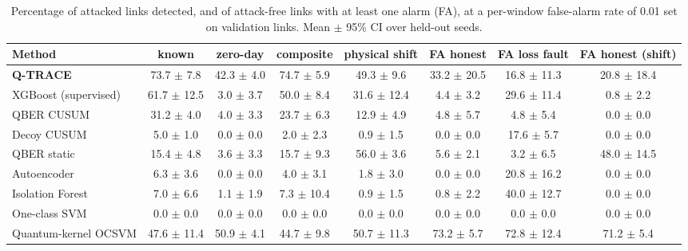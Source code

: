 \begin{table}[t]
\centering
\caption{Percentage of attacked links detected, and of attack-free links with at least one alarm (FA), at a per-window false-alarm rate of 0.01 set on validation links. Mean $\pm$ 95\% CI over held-out seeds.}
\label{tab:detection001}
\begin{tabular}{lccccccc}
\toprule
Method & known & zero-day & composite & physical shift & FA honest & FA loss fault & FA honest (shift) \\
\midrule
\textbf{Q-TRACE} & 73.7 $\pm$ 7.8 & 42.3 $\pm$ 4.0 & 74.7 $\pm$ 5.9 & 49.3 $\pm$ 9.6 & 33.2 $\pm$ 20.5 & 16.8 $\pm$ 11.3 & 20.8 $\pm$ 18.4 \\
XGBoost (supervised) & 61.7 $\pm$ 12.5 & 3.0 $\pm$ 3.7 & 50.0 $\pm$ 8.4 & 31.6 $\pm$ 12.4 & 4.4 $\pm$ 3.2 & 29.6 $\pm$ 11.4 & 0.8 $\pm$ 2.2 \\
QBER CUSUM & 31.2 $\pm$ 4.0 & 4.0 $\pm$ 3.3 & 23.7 $\pm$ 6.3 & 12.9 $\pm$ 4.9 & 4.8 $\pm$ 5.7 & 4.8 $\pm$ 5.4 & 0.0 $\pm$ 0.0 \\
Decoy CUSUM & 5.0 $\pm$ 1.0 & 0.0 $\pm$ 0.0 & 2.0 $\pm$ 2.3 & 0.9 $\pm$ 1.5 & 0.0 $\pm$ 0.0 & 17.6 $\pm$ 5.7 & 0.0 $\pm$ 0.0 \\
QBER static & 15.4 $\pm$ 4.8 & 3.6 $\pm$ 3.3 & 15.7 $\pm$ 9.3 & 56.0 $\pm$ 3.6 & 5.6 $\pm$ 2.1 & 3.2 $\pm$ 6.5 & 48.0 $\pm$ 14.5 \\
Autoencoder & 6.3 $\pm$ 3.6 & 0.0 $\pm$ 0.0 & 4.0 $\pm$ 3.1 & 1.8 $\pm$ 3.0 & 0.0 $\pm$ 0.0 & 20.8 $\pm$ 16.2 & 0.0 $\pm$ 0.0 \\
Isolation Forest & 7.0 $\pm$ 6.6 & 1.1 $\pm$ 1.9 & 7.3 $\pm$ 10.4 & 0.9 $\pm$ 1.5 & 0.8 $\pm$ 2.2 & 40.0 $\pm$ 12.7 & 0.0 $\pm$ 0.0 \\
One-class SVM & 0.0 $\pm$ 0.0 & 0.0 $\pm$ 0.0 & 0.0 $\pm$ 0.0 & 0.0 $\pm$ 0.0 & 0.0 $\pm$ 0.0 & 0.0 $\pm$ 0.0 & 0.0 $\pm$ 0.0 \\
Quantum-kernel OCSVM & 47.6 $\pm$ 11.4 & 50.9 $\pm$ 4.1 & 44.7 $\pm$ 9.8 & 50.7 $\pm$ 11.3 & 73.2 $\pm$ 5.7 & 72.8 $\pm$ 12.4 & 71.2 $\pm$ 5.4 \\
\bottomrule
\end{tabular}
\end{table}
